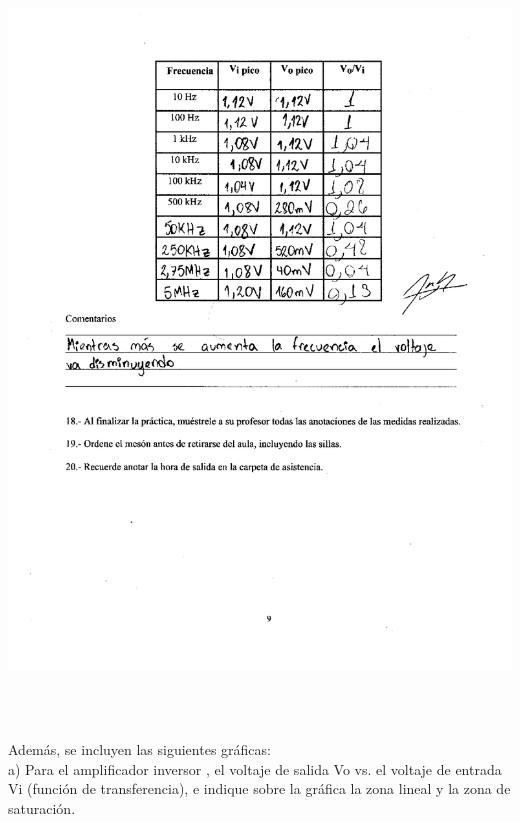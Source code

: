 \documentclass[12pt]{article}
\begin{document}
	\includegraphics[width=16cm,height=21cm]{Img/lab_9_page-0006}\\
	
	Además, se incluyen las siguientes gráficas:\\
	
	a) Para el amplificador inversor , el voltaje de salida Vo vs. el voltaje de entrada Vi (función de transferencia), e indique sobre la gráfica la zona lineal y la zona de saturación.\\
	
\end{document}
